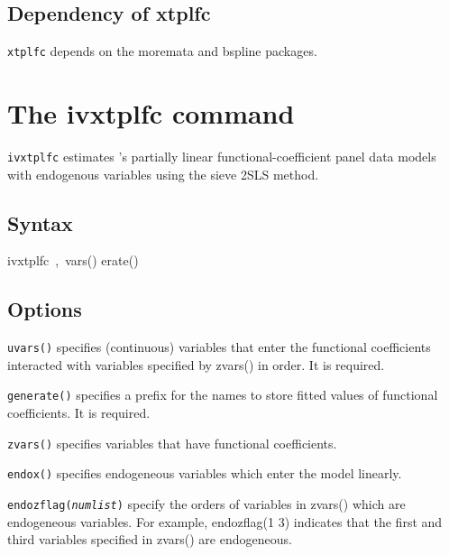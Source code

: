 \subsection{Dependency of xtplfc}
{\tt xtplfc} depends on the moremata and bspline packages.

\section{The ivxtplfc command}
{\tt ivxtplfc} estimates \citeauthor{Zhang2018}'s \citeyearpar{Zhang2018} partially linear functional-coefficient panel data models with endogenous variables using the sieve 2SLS method.

\subsection{Syntax}
\begin{stsyntax}
	ivxtplfc\
	\varlist,\
	vars(\varlist)
	erate(\ststring)
\end{stsyntax}


\subsection{Options}

\hangpara
{\tt uvars(\varlist)} specifies (continuous) variables that enter the functional coefficients interacted with variables
specified by zvars() in order. It is required.

\hangpara
{\tt generate(\ststring)} specifies a prefix for the names to store fitted values of functional coefficients. It is required.

\hangpara
{\tt zvars(\varlist)} specifies variables that have functional coefficients.

\hangpara
{\tt endox(\varlist)} specifies endogeneous variables which enter the model linearly.

\hangpara
{\tt endozflag(\textit{numlist})} specify the orders of variables in zvars(\varlist) which are endogeneous variables. For example,
endozflag(1 3) indicates that the first and third variables specified in zvars(\varlist) are endogeneous.


